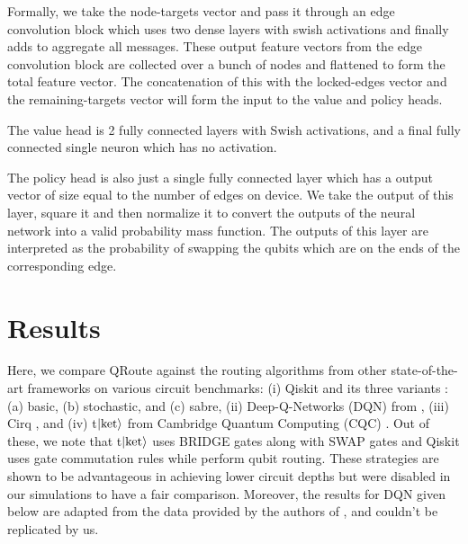 \documentclass[%
 reprint,
 longbibliography,
 amsmath,amssymb,
 aps,
]{revtex4-2}
\begin{document}
Formally, we take the node-targets vector and pass it through an edge convolution block \cite{nn_edge_conv} which uses two dense layers with swish activations \cite{nn_swish} and finally adds to aggregate all messages. These output feature vectors from the edge convolution block are collected over a bunch of nodes and flattened to form the total feature vector. The concatenation of this with the locked-edges vector and the remaining-targets vector will form the input to the value and policy heads.

The value head is 2 fully connected layers with Swish activations, and a final fully connected single neuron which has no activation.

The policy head is also just a single fully connected layer which has a output vector of size equal to the number of edges on device. We take the output of this layer, square it and then normalize it to convert the outputs of the neural network into a valid probability mass function. The outputs of this layer are interpreted as the probability of swapping the qubits which are on the ends of the corresponding edge.

\section{\label{sec:results}Results}
Here, we compare QRoute against the routing algorithms from other state-of-the-art frameworks on various circuit benchmarks: (i) Qiskit and its three variants \citep{comp_qiskit}: (a) basic, (b) stochastic, and (c) sabre, (ii) Deep-Q-Networks (DQN) from \citep{qroute_dqn2}, (iii) Cirq \citep{comp_cirq}, and (iv) t$\ket{\text{ket}}$ from Cambridge Quantum Computing (CQC) \citep{comp_pytket}. Out of these, we note that t$\ket{\text{ket}}$ uses BRIDGE gates along with SWAP gates and Qiskit uses gate commutation rules while perform qubit routing. These strategies are shown to be advantageous in achieving lower circuit depths \citep{bridge_gate} but were disabled in our simulations to have a fair comparison. Moreover, the results for DQN given below are adapted from the data provided by the authors of \citet{qroute_dqn2}, and couldn't be replicated by us.
\end{document}
